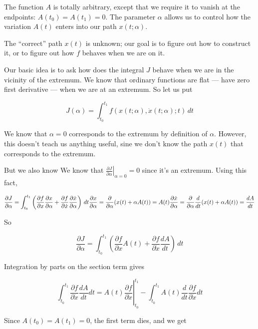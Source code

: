 \documentclass{article}
\begin{document}
The function \(A\) is totally arbitrary, except that we require it to vanish at the endpoints: \(A\left(t_0\right)=A\left(t_1\right)=0\). { }The
parameter \(\alpha\) allows us to control how the variation \(A(t)\) enters into our path \(x(t;\alpha )\).

The {``}correct{''} path \(x(t)\) is unknown; our goal is to figure out how to construct it, or to figure out how \(f\) behaves when we are on it.

Our basic idea is to ask how does the integral \(J\) behave when we are in the vicinity of the extremum. { }We know that ordinary functions are flat
--- have zero first derivative --- when we are at an extremum. { }So let us put

\[J(\alpha )=\int_{t_0}^{t_1} f\left(x(t;\alpha ),\dot{x}(t;\alpha );t\right) \, dt\]

We know that \(\alpha =0\) corresponds to the extremum by definition of \(\alpha\). { }However, this doesn{'}t teach us anything useful, sine we
don{'}t know the path \(x(t)\) that corresponds to the extremum.

But we also know We know that \(\left.\frac{\partial J}{\partial \alpha }\right| _{\alpha =0}=0\) since it{'}s an extremum. { }Using this fact,

\[\frac{\partial J}{\partial \alpha }=\int_{t_0}^{t_1} \left(\frac{\partial f}{\partial x} \frac{\partial x}{\partial \alpha }+\frac{\partial f}{\partial
\dot{x}} \frac{\partial \dot{x}}{\partial \alpha }\right) \, dt\\
\\
\frac{\partial x}{\partial \alpha }=\frac{\partial }{\partial \alpha }(x(t)+\alpha  A(t))=A(t)\\
\\
\frac{\partial \dot{x}}{\partial \alpha }=\frac{\partial }{\partial \alpha }\frac{d}{dt}(x(t)+\alpha  A(t))=\frac{dA}{dt}\]

So

\[\frac{\partial J}{\partial \alpha }=\int_{t_0}^{t_1} \left(\frac{\partial f}{\partial x} A(t)+\frac{\partial f}{\partial \dot{x}}\frac{dA}{dt}\right)
\, dt\]

Integration by parts on the section term gives

\[\left.\int _{t_0}^{t_1}\frac{\partial f}{\partial \dot{x}}\frac{dA}{dt}dt=A(t)\frac{\partial f}{\partial \dot{x}}\right| _{t_0}^{t_1}-\int _{t_0}^{t_1}A(t)\frac{d}{dt}\frac{\partial
f}{\partial \dot{x}}dt\]

Since \(A\left(t_0\right)=A\left(t_1\right)=0\), the first term dies, and we get 
\end{document}
